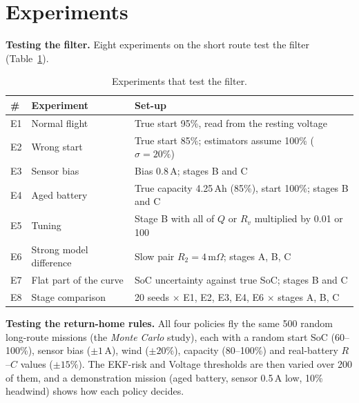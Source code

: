 \section{Experiments}\label{sec:m_experiments}

\textbf{Testing the filter.} Eight experiments on the short route test the filter (Table~\ref{tab:m_experiments}).

\begin{table}[htbp]
  \centering
  \caption{Experiments that test the filter.}
  \label{tab:m_experiments}
  \footnotesize
  \begin{tabular}{@{}lp{}p{}@{}}
    \toprule
    \# & Experiment & Set-up \\
    \midrule
    E1 & Normal flight & True start 95\%, read from the resting voltage \\
    E2 & Wrong start & True start 85\%; estimators assume 100\% ($\sigma = 20\%$) \\
    E3 & Sensor bias & Bias 0.8\,A; stages B and C \\
    E4 & Aged battery & True capacity 4.25\,Ah (85\%), start 100\%; stages B and C \\
    E5 & Tuning & Stage B with all of $Q$ or $R_v$ multiplied by 0.01 or 100 \\
    E6 & Strong model difference & Slow pair $R_2 = 4$\,m$\Omega$; stages A, B, C \\
    E7 & Flat part of the curve & SoC uncertainty against true SoC; stages B and C \\
    E8 & Stage comparison & 20 seeds $\times$ E1, E2, E3, E4, E6 $\times$ stages A, B, C \\
    \bottomrule
  \end{tabular}
\end{table}

\textbf{Testing the return-home rules.} All four policies fly the same 500 random long-route missions (the \emph{Monte Carlo} study), each with a random start SoC (60--100\%), sensor bias ($\pm 1$\,A), wind ($\pm 20\%$), capacity (80--100\%) and real-battery $R$--$C$ values ($\pm 15\%$). The EKF-risk and Voltage thresholds are then varied over 200 of them, and a demonstration mission (aged battery, sensor 0.5\,A low, 10\% headwind) shows how each policy decides.
